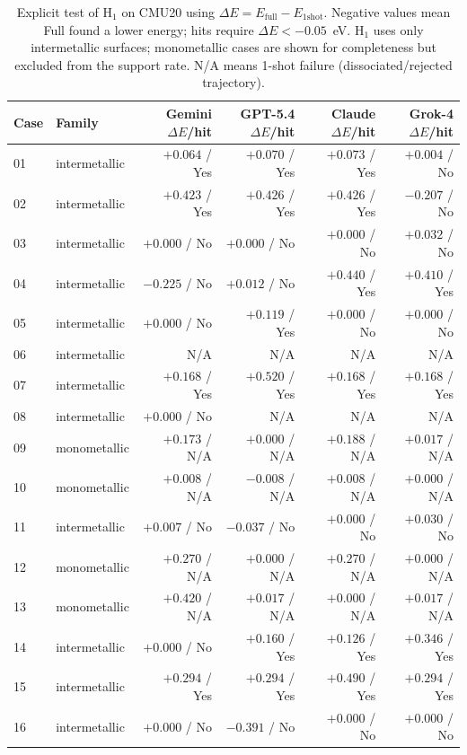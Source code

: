 \documentclass[%
 preprint,
 superscriptaddress,
 amsmath,amssymb,
 aps,
 prb,
 floatfix,
]{revtex4-2}
\begin{document}
\begin{table}[ht]
\centering
\small
\caption{Explicit test of H$_1$ on CMU20 using $\Delta E = E_{\mathrm{full}} - E_{\mathrm{1shot}}$. Negative values mean Full found a lower energy; hits require $\Delta E < -0.05$~eV. H$_1$ uses only intermetallic surfaces; monometallic cases are shown for completeness but excluded from the support rate. N/A means 1-shot failure (dissociated/rejected trajectory).}
\label{tab:si-cmu20-h1}
\begin{tabular}{llrrrr}
\toprule
Case & Family & Gemini $\Delta E$/hit & GPT-5.4 $\Delta E$/hit & Claude $\Delta E$/hit & Grok-4 $\Delta E$/hit \\
\midrule
01 & intermetallic & $+0.064$ / Yes & $+0.070$ / Yes & $+0.073$ / Yes & $+0.004$ / No \\
02 & intermetallic & $+0.423$ / Yes & $+0.426$ / Yes & $+0.426$ / Yes & $-0.207$ / No \\
03 & intermetallic & $+0.000$ / No & $+0.000$ / No & $+0.000$ / No & $+0.032$ / No \\
04 & intermetallic & $-0.225$ / No & $+0.012$ / No & $+0.440$ / Yes & $+0.410$ / Yes \\
05 & intermetallic & $+0.000$ / No & $+0.119$ / Yes & $+0.000$ / No & $+0.000$ / No \\
06 & intermetallic & N/A & N/A & N/A & N/A \\
07 & intermetallic & $+0.168$ / Yes & $+0.520$ / Yes & $+0.168$ / Yes & $+0.168$ / Yes \\
08 & intermetallic & $+0.000$ / No & N/A & N/A & N/A \\
09 & monometallic & $+0.173$ / N/A & $+0.000$ / N/A & $+0.188$ / N/A & $+0.017$ / N/A \\
10 & monometallic & $+0.008$ / N/A & $-0.008$ / N/A & $+0.008$ / N/A & $+0.000$ / N/A \\
11 & intermetallic & $+0.007$ / No & $-0.037$ / No & $+0.000$ / No & $+0.030$ / No \\
12 & monometallic & $+0.270$ / N/A & $+0.000$ / N/A & $+0.270$ / N/A & $+0.000$ / N/A \\
13 & monometallic & $+0.420$ / N/A & $+0.017$ / N/A & $+0.000$ / N/A & $+0.017$ / N/A \\
14 & intermetallic & $+0.000$ / No & $+0.160$ / Yes & $+0.126$ / Yes & $+0.346$ / Yes \\
15 & intermetallic & $+0.294$ / Yes & $+0.294$ / Yes & $+0.490$ / Yes & $+0.294$ / Yes \\
16 & intermetallic & $+0.000$ / No & $-0.391$ / No & $+0.000$ / No & $+0.000$ / No \\

\end{tabular}
\end{table}
\end{document}
